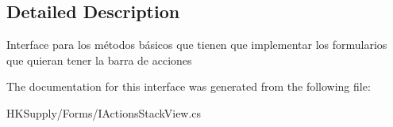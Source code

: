 \subsection{Detailed Description}
Interface para los métodos básicos que tienen que implementar los formularios que quieran tener la barra de acciones 



The documentation for this interface was generated from the following file\+:\begin{DoxyCompactItemize}
\item 
H\+K\+Supply/\+Forms/I\+Actions\+Stack\+View.\+cs\end{DoxyCompactItemize}
